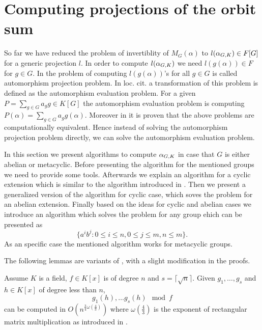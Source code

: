 \section{Computing projections of the orbit sum}\label{sec:osum}

So far we have reduced the problem of invertiblity of $M_G(\alpha)$ to $l(\alpha_{G,K}) \in F[G]$ for a generic
projection $l$. In order to compute $l(\alpha_{G,K})$ we need $l(g(\alpha)) \in F$ for $g \in G$. In \cite{Kaltofen} the problem of
computing $l(g(\alpha))$'s for all $g \in G$ is called automorphism projection problem. In loc. cit. a transformation of this problem
is defined as the automorphism evaluation problem. For a given $P = \sum_{g \in G}a_g g \in K[G]$ the automorphism evaluation problem
is computing $P(\alpha) = \sum_{g \in G}a_g g(\alpha)$. Moreover in \cite{Kaltofen} it is proven that the above problems are
 computationally equivalent. Hence instead of solving the automorphism projection problem directly, we can solve the automorphism
 evaluation problem.

In this section we present algorithms to compute $\alpha_{G,K}$ in case that $G$ is either abelian or metacyclic. 
Before presenting the algorithm for the mentioned groups we need to provide some tools. Afterwards we explain an algorithm
for a cyclic extension which is similar to the algorithm introduced in \cite{Kaltofen}. Then we present a generalized version 
of the algorithm for cyclic case, which soves the problem for an abelian extension. Finally based on the ideas for cyclic and 
abelian cases we introduce an algorithm which solves the problem for any group ehich can be presented as 
$$\lbrace a^ib^j: 0 \leq i \leq n,  0\leq j \leq m, n \leq m \rbrace.$$ 
As an specific case the mentioned algorithm works for metacyclic groups.

The following lemmas are variants of \cite[Lemma 3 $\&$ Lemma 4]{Kaltofen}, with a slight modification in the proofs.

\begin{lemma}\cite{Kaltofen}\label{modcom}
Assume $K$ is a field, $f\in K[x]$ is of degree $n$ and $s = \lceil\sqrt{n}\rceil$. Given $g_1, \ldots , g_{s}$ and 
$h \in K[x]$ of degree less than $n$, $$g_1(h), \ldots g_{s}(h) \mod f$$ can be computed in
$O(n^{\frac{3}{4}\omega(\frac{4}{3})})$ where $\omega(\frac{4}{3})$ is the exponent of rectangular matrix 
multiplication as introduced in \cite{LeGall}. 
\end{lemma}

